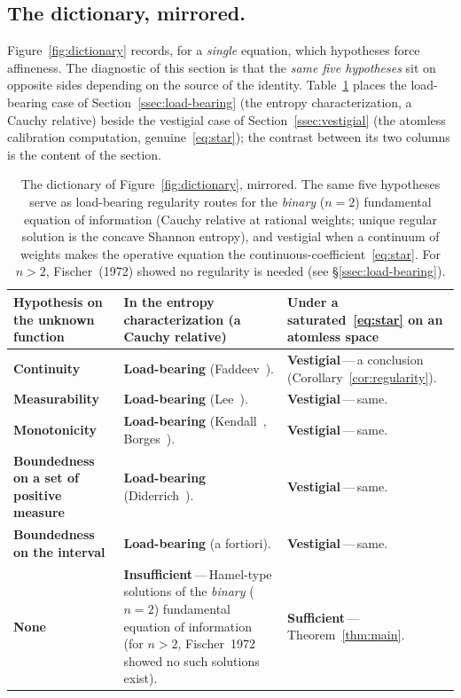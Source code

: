 \documentclass{article}
\theoremstyle{plain}
\theoremstyle{definition}
\begin{document}
\subsection{The dictionary, mirrored.}
\label{ssec:mirror}

Figure~\ref{fig:dictionary} records, for a \emph{single} equation,
which hypotheses force affineness. The diagnostic of this section is
that the \emph{same five hypotheses} sit on opposite sides depending
on the source of the identity. Table~\ref{tab:mirror} places the
load-bearing case of Section~\ref{ssec:load-bearing} (the entropy
characterization, a Cauchy relative) beside the vestigial case of
Section~\ref{ssec:vestigial} (the atomless calibration computation,
genuine~\eqref{eq:star}); the contrast between its two columns is
the content of the section.

\begin{table}[ht]
\renewcommand{\arraystretch}{1.4}
\centering
\begin{tabularx}{\linewidth}{@{} >{\raggedright\arraybackslash}X
  >{\raggedright\arraybackslash}X
  >{\raggedright\arraybackslash}X @{}}
\toprule
\textbf{Hypothesis on the unknown function} &
\textbf{In the entropy characterization (a Cauchy relative)} &
\textbf{Under a saturated~\eqref{eq:star} on an atomless space} \\
\midrule
\textbf{Continuity}
  & \textbf{Load-bearing} (Faddeev~\cite{Faddeev1957}).
  & \textbf{Vestigial}\,---\,a conclusion (Corollary~\ref{cor:regularity}). \\
\midrule
\textbf{Measurability}
  & \textbf{Load-bearing} (Lee~\cite{Lee1964}).
  & \textbf{Vestigial}\,---\,same. \\
\midrule
\textbf{Monotonicity}
  & \textbf{Load-bearing} (Kendall~\cite{Kendall1964}, Borges~\cite{Borges1967}).
  & \textbf{Vestigial}\,---\,same. \\
\midrule
\textbf{Boundedness on a set of positive measure}
  & \textbf{Load-bearing} (Diderrich~\cite{Diderrich1975}).
  & \textbf{Vestigial}\,---\,same. \\
\midrule
\textbf{Boundedness on the interval}
  & \textbf{Load-bearing} (a fortiori).
  & \textbf{Vestigial}\,---\,same. \\
\midrule
\textbf{None}
  & \textbf{Insufficient}\,---\,Hamel-type solutions of the \emph{binary} ($n{=}2$) fundamental equation of information~\cite{AczelDaroczy1975} (for $n{>}2$, Fischer~1972 showed no such solutions exist).
  & \textbf{Sufficient}\,---\,Theorem~\ref{thm:main}. \\
\bottomrule
\end{tabularx}
\caption{The dictionary of Figure~\ref{fig:dictionary}, mirrored. The
same five hypotheses serve as load-bearing regularity routes for the \emph{binary} ($n{=}2$)
fundamental equation of information (Cauchy relative at rational weights;
unique regular solution is the concave Shannon entropy), and vestigial
when a continuum of weights makes the operative equation the
continuous-coefficient~\eqref{eq:star}. For $n{>}2$, Fischer~(1972)
showed no regularity is needed (see \S\ref{ssec:load-bearing}).}
\label{tab:mirror}
\end{table}
\end{document}
